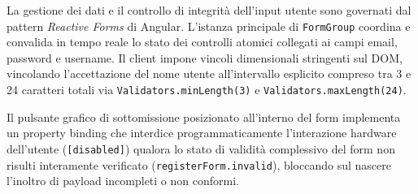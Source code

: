 \documentclass[11pt,a4paper]{article}
\begin{document}
\begin{itemize}
    La gestione dei dati e il controllo di integrità dell'input utente sono governati dal pattern \textit{Reactive Forms} di Angular. L'istanza principale di \texttt{FormGroup} coordina e convalida in tempo reale lo stato dei controlli atomici collegati ai campi email, password e username. Il client impone vincoli dimensionali stringenti sul DOM, vincolando l'accettazione del nome utente all'intervallo esplicito compreso tra 3 e 24 caratteri totali via \texttt{Validators.minLength(3)} e \texttt{Validators.maxLength(24)}.
    
    Il pulsante grafico di sottomissione posizionato all'interno del form implementa un property binding che interdice programmaticamente l'interazione hardware dell'utente (\texttt{[disabled]}) qualora lo stato di validità complessivo del form non risulti interamente verificato (\texttt{registerForm.invalid}), bloccando sul nascere l'inoltro di payload incompleti o non conformi.
    

\end{itemize}
\end{document}
